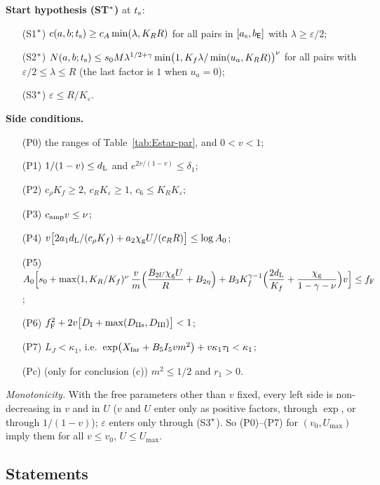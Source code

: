 \medskip\noindent\textbf{Start hypothesis (ST$\ESs$)} at $t_{\mathrm s}$:
\begin{itemize}
\item[(S1$\ESs$)] $c(a,b;t_{\mathrm s})\ge c_A\min(\lambda,K_RR)$ for all pairs in $[a_{\mathrm s},b_{\mathsf E}]$ with $\lambda\ge\varepsilon/2$;
\item[(S2$\ESs$)] $N(a,b;t_{\mathrm s})\le s_0M\lambda^{1/2+\gamma}\min\bigl(1,K_f\lambda/\min(u_a,K_RR)\bigr)^\nu$ for all pairs with
$\varepsilon/2\le\lambda\le R$ (the last factor is $1$ when $u_a=0$);
\item[(S3$\ESs$)] $\varepsilon\le R/K_\varepsilon$.
\end{itemize}

\noindent\textbf{Side conditions.}
\begin{itemize}
\item[(P0)] the ranges of Table~\ref{tab:Estar-par}, and $0<v<1$;
\item[(P1)] $1/(1-v)\le d_{\mathrm L}$ and $e^{2v/(1-v)}\le\delta_1$;
\item[(P2)] $c_\rho K_f\ge2$, $c_RK_\varepsilon\ge1$, $c_6\le K_RK_\varepsilon$;
\item[(P3)] $c_{\mathrm{amp}} v\le\nu$;
\item[(P4)] $v\bigl[2a_1d_{\mathrm L}/(c_\rho K_f)+a_2\chi_{\mathrm g} U/(c_RR)\bigr]\le\log A_0$;
\item[(P5)] $A_0\Bigl[s_0+\max(1,K_R/K_f)^\nu\,\dfrac vm\Bigl(\dfrac{B_{2U}\chi_{\mathrm g} U}R+B_{2\eta}\Bigr)
+B_3K_f^{\gamma-1}\Bigl(\dfrac{2d_{\mathrm L}}{K_f}+\dfrac{\chi_{\mathrm g}}{1-\gamma-\nu}\Bigr)v\Bigr]\le f_{\mathrm F}$;
\item[(P6)] $f_{\mathrm F}^2+2v\bigl[D_{\mathrm I}+\max(D_{\mathrm{IIs}},D_{\mathrm{IIl}})\bigr]<1$;
\item[(P7)] $L_J<\kappa_1$, i.e.\ $\exp\bigl(X_{\mathrm{far}}+B_5I_5vm^2\bigr)+v\kappa_1\tau_{\mathrm I}<\kappa_1$;
\item[(Pc)] (only for conclusion (c)) $m^2\le1/2$ and $r_1>0$.
\end{itemize}
\emph{Monotonicity.} With the free parameters other than $v$ fixed, every left side is non-decreasing in $v$ and in $U$ ($v$ and $U$
enter only as positive factors, through $\exp$, or through $1/(1-v)$); $\varepsilon$ enters only through (S3$\ESs$). So
\textup{(P0)}--\textup{(P7)} for $(v_0,U_{\max})$ imply them for all $v\le v_0$, $U\le U_{\max}$.

\subsection{Statements}

